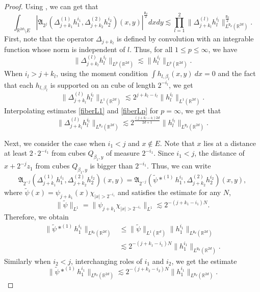 \documentclass[a4paper,reqno]{amsart}
\theoremstyle{definition}
\theoremstyle{remark}
\numberwithin{equation}{section}
\newcommand{\R}{{\mathbb {R}}}
\begin{document}
	\begin{proof}
		Using , we can get that
		\begin{equation}\label{badloc}
			\int_{\R^{2d}\setminus E}\left|\mathfrak{A}_{2^j}(\Delta_{j+k_1}^{(1)}h_1^{i_1},\Delta_{j+k_2}^{(2)}h_2^{i_2})(x,y)\right|^\frac{\mathsf{p}_d}{2}dxdy\lesssim\prod_{l=1}^2\|\Delta_{j+k_l}^{(l)}h_l^{i_l}\|_{L^{{\mathsf{p}_d}}(\R^{2d})}^\frac{\mathsf{p}_d}{2}.
		\end{equation}
		First, note that the operator $\Delta_{j+k_l}$ is defined by convolution with an integrable function whose norm is independent of $l$. Thus, for all $1\leq p\leq\infty$, we have
		\begin{equation}\label{fiberLp}
			\|\Delta_{j+k_l}^{(l)}h_l^{i_l}\|_{L^{p}(\R^{2d})}\lesssim\|h_l^{i_l}\|_{L^{p}(\R^{2d})}.
		\end{equation}
		When $i_l>j+k_l$, using the moment condition $\int h_{l,\beta_l}(x,y)~dx=0$ and the fact that each $h_{l,\beta_l}$ is supported on an cube of length $2^{-i_l}$, we get
		\begin{equation}\label{fiberL1}
			\|\Delta_{j+k_l}^{(l)}h_l^{i_l}\|_{L^{1}(\R^{2d})}\lesssim2^{j+k_l-i_l}\|h_l^{i_l}\|_{L^{1}(\R^{2d})}.
		\end{equation}
		Interpolating estimates \eqref{fiberL1} and \eqref{fiberLp} for $p=\infty$, we get that
		\[\|\Delta_{j+k_l}^{(l)}h_l^{i_l}\|_{L^{{\mathsf{p}_d}}(\R^{2d})}\lesssim2^{\frac{(j+k_l-i_l)2d}{2d+1}}\|h_l^{i_l}\|_{L^{{\mathsf{p}_d}}(\R^{2d})}.\]
		
		Next, we consider the case when $i_1<j$ and $x\notin E$. Note that $x$ lies at a distance at least $2\cdot 2^{-i_1}$ from cubes $Q_{\beta_1,y}$ of measure $2^{-i_1}$. Since $i_1<j$, the distance of $x+2^{-j}z_1$ from cubes $Q_{\beta_1,y}$ is bigger than $2^{-i_1}$. Thus, we can write
		\[\mathfrak{A}_{2^{-j}}(\Delta_{j+k_1}^{(1)}h_1^{i_1},\Delta_{j+k_2}^{(2)}h_2^{i_2})(x,y)=\mathfrak{A}_{2^{-j}}(\widetilde{\psi}\ast^{(1)}h_1^{i_1},\Delta_{j+k_2}^{(2)}h_2^{i_2})(x,y),\]
		where $\widetilde{\psi}(x)=\psi_{j+k_1}(x)\chi_{|x|>2^{-i_1}}$ and satisfies the estimate for any $N$,
		\[\|\widetilde{\psi}\|_{L^1}=\|\psi_{j+k_1}\chi_{|x|>2^{-i_1}}\|_{L^1}\lesssim 2^{-(j+k_1-i_1)N}.\]
		Therefore, we obtain
		\begin{align*}
			\|\widetilde{\psi}\ast^{(1)}h_1^{i_1}\|_{L^{{\mathsf{p}_d}}(\R^{2d})}&\leq \|\widetilde{\psi}\|_{L^1(\R^d)}\|h_1^{i_1}\|_{L^{{\mathsf{p}_d}}(\R^{2d})}\\
			&\lesssim 2^{-(j+k_1-i_1)N}\|h_1^{i_1}\|_{L^{{\mathsf{p}_d}}(\R^{2d})}.
		\end{align*}
		Similarly when $i_2<j$, interchanging roles of $i_1$ and $i_2$, we get the estimate
		\[\|\widetilde{\psi}\ast^{(1)}h_1^{i_1}\|_{L^{{\mathsf{p}_d}}(\R^{2d})}\lesssim 2^{-(j+k_2-i_2)N}\|h_1^{i_1}\|_{L^{{\mathsf{p}_d}}(\R^{2d})}.\]
	\end{proof}
\end{document}
